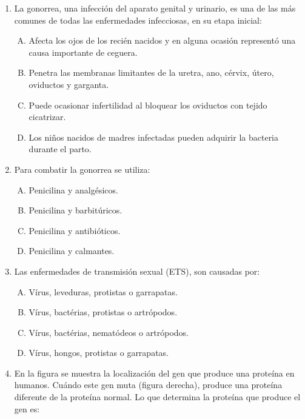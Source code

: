 \begin{enumerate}
\item La gonorrea, una infección del aparato genital y urinario, es una de las más comunes de todas las enfermedades infecciosas, en su etapa inicial: \label{bio-11}

\begin{enumerate}[(A)]
\item Afecta los ojos de los recién nacidos y en alguna ocasión representó una causa importante de ceguera. 
\item Penetra las membranas limitantes de la uretra, ano, cérvix, útero, oviductos y garganta.
\item Puede ocasionar infertilidad al bloquear los oviductos con tejido cicatrizar. 
\item Los niños nacidos de madres infectadas pueden adquirir la bacteria durante el parto. 
\end{enumerate}


\item Para combatir la gonorrea se utiliza: \label{bio-12}

\begin{enumerate}[(A)]
\item Penicilina y analgésicos. 
\item Penicilina y barbitúricos. 
\item Penicilina y antibióticos. 
\item Penicilina y calmantes. 
\end{enumerate}

\item  Las enfermedades de transmisión sexual (ETS), son causadas por:\label{bio-13}

\begin{enumerate}[(A)]
\item Vírus, leveduras, protistas o garrapatas. 
\item Vírus, bactérias, protistas o artrópodos. 
\item Vírus, bactérias, nematódeos o artrópodos. 
\item Vírus, hongos, protistas o garrapatas.
\end{enumerate}

\item En la figura se muestra  la localización  del gen que produce una proteína en humanos. Cuándo este gen muta (figura    derecha), produce una proteína diferente de la proteína normal. Lo que determina la proteína que produce el gen es:  \label{bio-14}


\end{enumerate}
